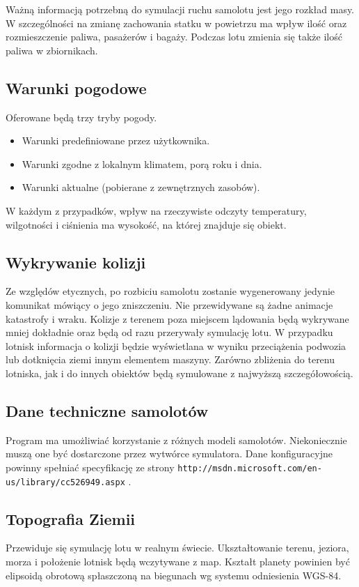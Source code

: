 \documentclass{mwrep}
\begin{document}
\vspace*{\baselineskip}
Ważną informacją potrzebną do symulacji ruchu samolotu jest jego rozkład masy. W szczególności na zmianę zachowania statku w powietrzu ma wpływ ilość oraz rozmieszczenie paliwa, pasażerów i bagaży. Podczas lotu zmienia się także ilość paliwa w zbiornikach.

\subsection{Warunki pogodowe}
Oferowane będą trzy tryby pogody.
\begin{itemize}
\item Warunki predefiniowane przez użytkownika.
\item Warunki zgodne z lokalnym klimatem, porą roku i dnia.
\item Warunki aktualne (pobierane z zewnętrznych zasobów).
\end{itemize}
W każdym z przypadków, wpływ na rzeczywiste odczyty temperatury, wilgotności i ciśnienia ma wysokość, na której znajduje się obiekt.


\subsection{Wykrywanie kolizji}
Ze względów etycznych, po rozbiciu samolotu zostanie wygenerowany jedynie komunikat mówiący o jego zniszczeniu. Nie przewidywane są żadne animacje katastrofy i wraku. Kolizje z terenem poza miejscem lądowania będą wykrywane mniej dokładnie oraz będą od razu przerywały symulację lotu. W przypadku lotnisk informacja o kolizji będzie wyświetlana w wyniku przeciążenia podwozia lub dotknięcia ziemi innym elementem maszyny. Zarówno zbliżenia do terenu lotniska, jak i do innych obiektów będą symulowane z najwyższą szczegółowością.

\subsection{Dane techniczne samolotów}
Program ma umożliwiać korzystanie z różnych modeli samolotów. Niekoniecznie muszą one być dostarczone przez wytwórce symulatora. Dane konfiguracyjne powinny spełniać specyfikację ze strony \linebreak \texttt{http://msdn.microsoft.com/en-us/library/cc526949.aspx} .

\subsection{Topografia Ziemii}
Przewiduje się symulację lotu w realnym świecie. Ukształtowanie terenu, jeziora, morza i położenie lotnisk będą wczytywane z map. Kształt planety powinien być elipsoidą obrotową spłaszczoną na biegunach wg systemu odniesienia WGS-84.
\end{document}
